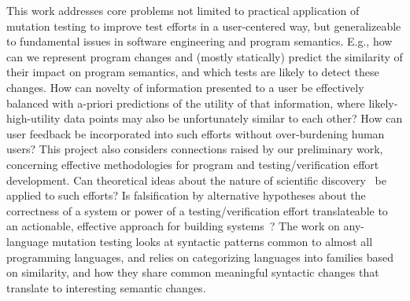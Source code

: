 This work addresses core problems not limited to practical application of mutation testing to improve test efforts in a user-centered way, but generalizeable to fundamental issues in software engineering and program semantics.  E.g., how can we represent program changes and (mostly statically) predict the similarity of their impact on program semantics, and which tests are likely to detect these changes.  How can novelty of information presented to a user be effectively balanced with a-priori predictions of the utility of that information, where likely-high-utility data points may also be unfortunately similar to each other?  How can user feedback be incorporated into such efforts without over-burdening human users?  This project also considers connections raised by our preliminary work, concerning effective methodologies for program and testing/verification effort development.  Can theoretical ideas about the nature of scientific discovery~\cite{Popper,popperconjectures,lakatos} be applied to such efforts?  Is falsification by alternative hypotheses about the correctness of a system or power of a testing/verification effort translateable to an actionable, effective approach for building systems~\cite{groce2015verified,groce2018verified}? 
The work on any-language mutation testing looks at syntactic patterns common to almost all programming languages, and relies on categorizing languages into families based on similarity, and how they share common meaningful syntactic changes that translate to interesting semantic changes.  
